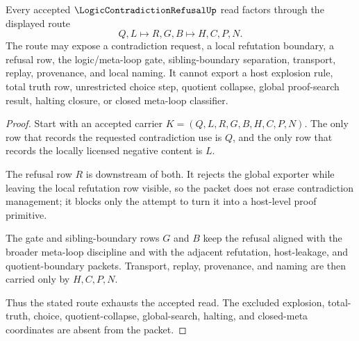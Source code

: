 \begin{theorem}
\label{thm:logic-contradiction-refusal-nonescape}
Every accepted $\LogicContradictionRefusalUp$ read factors through the displayed route
$$
Q,L \longmapsto R,G,B \longmapsto H,C,P,N .
$$
The route may expose a contradiction request, a local refutation boundary, a refusal row, the logic/meta-loop gate, sibling-boundary separation, transport, replay, provenance, and local naming. It cannot export a host explosion rule, total truth row, unrestricted choice step, quotient collapse, global proof-search result, halting closure, or closed meta-loop classifier.
\end{theorem}
\begin{proof}
Start with an accepted carrier $K=(Q,L,R,G,B,H,C,P,N)$. The only row that records the requested contradiction use is $Q$, and the only row that records the locally licensed negative content is $L$.

The refusal row $R$ is downstream of both. It rejects the global exporter while leaving the local refutation row visible, so the packet does not erase contradiction management; it blocks only the attempt to turn it into a host-level proof primitive.

The gate and sibling-boundary rows $G$ and $B$ keep the refusal aligned with the broader meta-loop discipline and with the adjacent refutation, host-leakage, and quotient-boundary packets. Transport, replay, provenance, and naming are then carried only by $H,C,P,N$.

Thus the stated route exhausts the accepted read. The excluded explosion, total-truth, choice, quotient-collapse, global-search, halting, and closed-meta coordinates are absent from the packet.
\end{proof}

